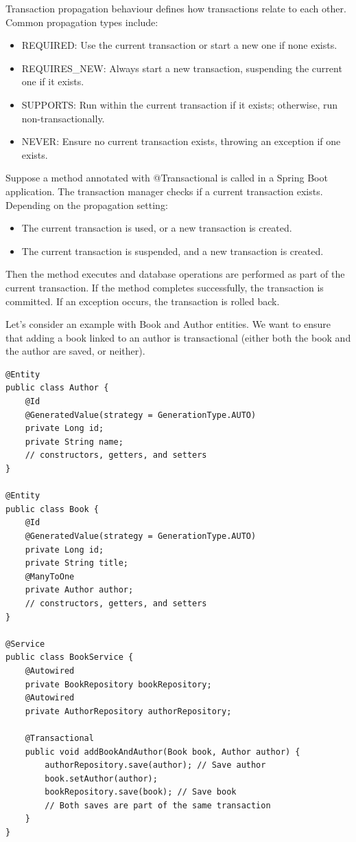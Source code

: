 Transaction propagation behaviour defines how transactions relate to each other. Common propagation types include:

\begin{itemize}
\item REQUIRED: Use the current transaction or start a new one if none exists.
\item REQUIRES\_NEW: Always start a new transaction, suspending the current one if it exists.
\item SUPPORTS: Run within the current transaction if it exists; otherwise, run non-transactionally.
\item NEVER: Ensure no current transaction exists, throwing an exception if one exists.
\end{itemize}


Suppose a method annotated with @Transactional is called in a Spring Boot application. The transaction manager checks if a current transaction exists. Depending on the propagation setting:
\begin{itemize}
\item The current transaction is used, or a new transaction is created.
\item The current transaction is suspended, and a new transaction is created.
\end{itemize}
Then the method executes and database operations are performed as part of the current transaction.
If the method completes successfully, the transaction is committed.
If an exception occurs, the transaction is rolled back.

Let’s consider an example with Book and Author entities. We want to ensure that adding a book linked to an author is transactional (either both the book and the author are saved, or neither).

\begin{lstlisting}
@Entity
public class Author {
    @Id
    @GeneratedValue(strategy = GenerationType.AUTO)
    private Long id;
    private String name;
    // constructors, getters, and setters
}

@Entity
public class Book {
    @Id
    @GeneratedValue(strategy = GenerationType.AUTO)
    private Long id;
    private String title;
    @ManyToOne
    private Author author;
    // constructors, getters, and setters
}

@Service
public class BookService {
    @Autowired
    private BookRepository bookRepository;
    @Autowired
    private AuthorRepository authorRepository;

    @Transactional
    public void addBookAndAuthor(Book book, Author author) {
        authorRepository.save(author); // Save author
        book.setAuthor(author);
        bookRepository.save(book); // Save book
        // Both saves are part of the same transaction
    }
}
\end{lstlisting}

